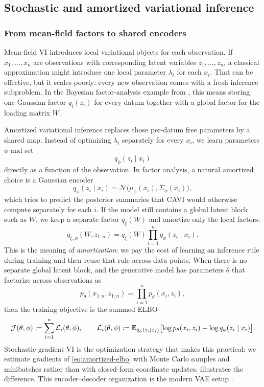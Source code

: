 \subsection{Stochastic and amortized variational inference}
\label{subsec:amortized-vi}

\subsubsection{From mean-field factors to shared encoders}

Mean-field VI introduces local variational objects for each observation.
If $x_1,\dots,x_n$ are observations with corresponding latent variables $z_1,\dots,z_n$, a classical approximation might introduce one local parameter $\lambda_i$ for each $x_i$.
That can be effective, but it scales poorly:
every new observation comes with a fresh inference subproblem.
In the Bayesian factor-analysis example from , this means storing one Gaussian factor \(q_i(z_i)\) for every datum together with a global factor for the loading matrix \(W\).

Amortized variational inference replaces those per-datum free parameters by a shared map.
Instead of optimizing \(\lambda_i\) separately for every \(x_i\), we learn parameters \(\phi\) and set
\[
  q_\phi(z_i\mid x_i)
\]
directly as a function of the observation.
In factor analysis, a natural amortized choice is a Gaussian encoder
\[
  q_\phi(z_i\mid x_i)
  =
  \mathcal{N}\!\bigl(\mu_\phi(x_i),\Sigma_\phi(x_i)\bigr),
\]
which tries to predict the posterior summaries that CAVI would otherwise compute separately for each \(i\).
If the model still contains a global latent block such as \(W\), we keep a separate factor \(q_\xi(W)\) and amortize only the local factors:
\[
  q_{\xi,\phi}(W,z_{1:n})
  =
  q_\xi(W)\prod_{i=1}^n q_\phi(z_i\mid x_i).
\]
This is the meaning of \emph{amortization}: we pay the cost of learning an inference rule during training and then reuse that rule across data points.
When there is no separate global latent block, and the generative model has parameters \(\theta\) that factorize across observations as
\[
  p_\theta(x_{1:n},z_{1:n})
  =
  \prod_{i=1}^n p_\theta(x_i,z_i),
\]
then the training objective is the summed ELBO
\begin{equation}
  \mathcal{J}(\theta,\phi)
  \coloneqq
  \sum_{i=1}^n \mathcal{L}_i(\theta,\phi),
  \qquad
  \mathcal{L}_i(\theta,\phi)
  \coloneqq
  \mathbb{E}_{q_\phi(z_i\mid x_i)}
  \bigl[\log p_\theta(x_i,z_i) - \log q_\phi(z_i\mid x_i)\bigr].
  \label{eq:amortized-elbo}
\end{equation}
Stochastic-gradient VI is the optimization strategy that makes this practical: we estimate gradients of \eqref{eq:amortized-elbo} with Monte Carlo samples and minibatches rather than with closed-form coordinate updates.
 illustrates the difference.
This encoder--decoder organization is the modern VAE setup \citep[\S2.3]{kingma_welling_2014_aevb}.

